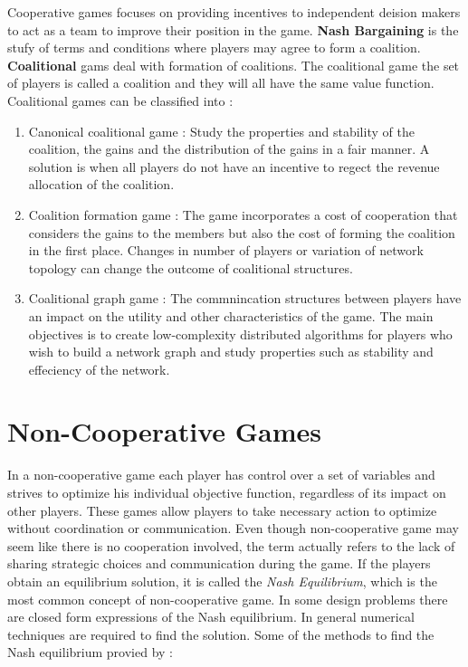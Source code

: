 \documentclass[phd, 12pt, print]{fauthesis}
\begin{document}
Cooperative games focuses on providing incentives to independent deision makers
to act as a team to improve their position in the game. \textbf{Nash Bargaining}
is the stufy of terms and conditions where players may agree to form a coalition.
\textbf{Coalitional} gams deal with formation of coalitions.\cite{Tushar2} The coalitional
game the set of players is called a coalition and they will all have the same value
function. Coalitional games can be classified into :
\begin{enumerate}
  \item Canonical coalitional game : Study the properties and stability of the coalition, 
  the gains and the distribution of the gains in a fair manner. A solution is when all 
	players do not have an incentive to regect the revenue allocation of the coalition.

	\item Coalition formation game : The game incorporates a cost of cooperation that 
	considers the gains to the members but also the cost of forming the coalition in the 
	first place. Changes in number of players or variation of network topology can change 
	the outcome of coalitional structures.

	\item Coalitional graph game : The commnincation structures between players have an impact on the
	utility and other characteristics of the game. The main objectives is to create low-complexity
	distributed algorithms for players who wish to build a network graph and study properties
	such as stability and effeciency of the network.

\end{enumerate}



\section{Non-Cooperative Games}

In a non-cooperative game each player has control over a set of variables and strives
to optimize his individual objective function, regardless of its impact on other players.
These games allow players to take necessary action to optimize without coordination or communication. 
Even though non-cooperative game may seem like there is no cooperation involved, the term actually
refers to the lack of sharing strategic choices and communication during the game.\cite{Tushar2}
If the players obtain an equilibrium solution, it is called the \textit{Nash Equilibrium},
which is the most common concept of non-cooperative game.\cite{Azad}  In some design problems there 
are closed form expressions of the Nash equilibrium. In general numerical techniques are required
to find the solution. Some of the methods to find the Nash equilibrium provied by \cite{Azad} :
\end{document}
